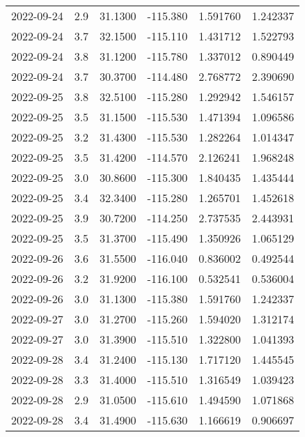 \begin{tabular}{lrrrrr}
2022-09-24 &       2.9 &  31.1300 &  -115.380 &         1.591760 &         1.242337 \\
2022-09-24 &       3.7 &  32.1500 &  -115.110 &         1.431712 &         1.522793 \\
2022-09-24 &       3.8 &  31.1200 &  -115.780 &         1.337012 &         0.890449 \\
2022-09-24 &       3.7 &  30.3700 &  -114.480 &         2.768772 &         2.390690 \\
2022-09-25 &       3.8 &  32.5100 &  -115.280 &         1.292942 &         1.546157 \\
2022-09-25 &       3.5 &  31.1500 &  -115.530 &         1.471394 &         1.096586 \\
2022-09-25 &       3.2 &  31.4300 &  -115.530 &         1.282264 &         1.014347 \\
2022-09-25 &       3.5 &  31.4200 &  -114.570 &         2.126241 &         1.968248 \\
2022-09-25 &       3.0 &  30.8600 &  -115.300 &         1.840435 &         1.435444 \\
2022-09-25 &       3.4 &  32.3400 &  -115.280 &         1.265701 &         1.452618 \\
2022-09-25 &       3.9 &  30.7200 &  -114.250 &         2.737535 &         2.443931 \\
2022-09-25 &       3.5 &  31.3700 &  -115.490 &         1.350926 &         1.065129 \\
2022-09-26 &       3.6 &  31.5500 &  -116.040 &         0.836002 &         0.492544 \\
2022-09-26 &       3.2 &  31.9200 &  -116.100 &         0.532541 &         0.536004 \\
2022-09-26 &       3.0 &  31.1300 &  -115.380 &         1.591760 &         1.242337 \\
2022-09-27 &       3.0 &  31.2700 &  -115.260 &         1.594020 &         1.312174 \\
2022-09-27 &       3.0 &  31.3900 &  -115.510 &         1.322800 &         1.041393 \\
2022-09-28 &       3.4 &  31.2400 &  -115.130 &         1.717120 &         1.445545 \\
2022-09-28 &       3.3 &  31.4000 &  -115.510 &         1.316549 &         1.039423 \\
2022-09-28 &       2.9 &  31.0500 &  -115.610 &         1.494590 &         1.071868 \\
2022-09-28 &       3.4 &  31.4900 &  -115.630 &         1.166619 &         0.906697 \\

\end{tabular}
